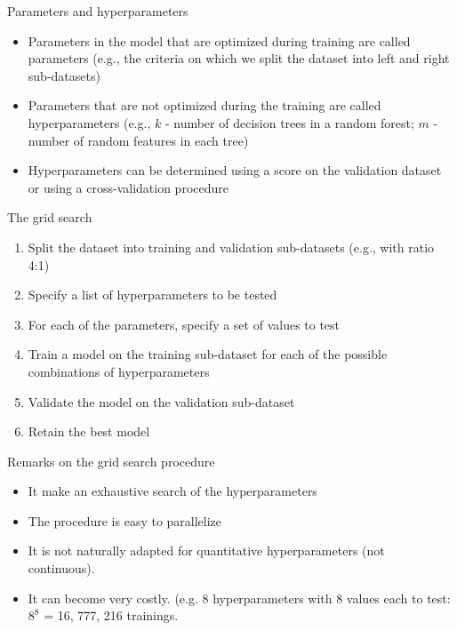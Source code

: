 \documentclass[handout, 10pt]{beamer}
\begin{document}
\begin{frame}{Parameters and hyperparameters}
\begin{itemize}
    \item Parameters in the model that are optimized during training are called \alert{parameters} (e.g., the criteria on which we split the dataset into left and right sub-datasets)
\pause    
    \item Parameters that are not optimized during the training are called \alert{hyperparameters} (e.g., $k$ - number of decision trees in a random forest; $m$ - number of random features in each tree)
\pause    
    \item Hyperparameters can be determined using a score on the \alert{validation dataset} or using a \alert{cross-validation procedure}
\end{itemize}
\end{frame}

\begin{frame}{The grid search}
\begin{enumerate}
    \item Split the dataset into \alert{training} and \alert{validation} sub-datasets (e.g., with ratio 4:1)
    \item Specify a list of hyperparameters to be tested
    \item For each of the parameters, specify a set of values to test
    \item Train a model on the training sub-dataset for each of the possible combinations of hyperparameters
    \item Validate the model on the validation sub-dataset
    \item Retain the best model
\end{enumerate}
\end{frame}

\begin{frame}{Remarks on the grid search procedure}
\begin{itemize}
    \item It make an \alert{exhaustive} search of the hyperparameters
    \item The procedure is easy to \alert{parallelize}
    \item It is not naturally adapted for quantitative hyperparameters (not continuous).
    \item It can become \alert{very costly}. (e.g. 8 hyperparameters with 8 values each to test: $8^8$ = 16, 777, 216 trainings.
\end{itemize}
\end{frame}
\end{document}
